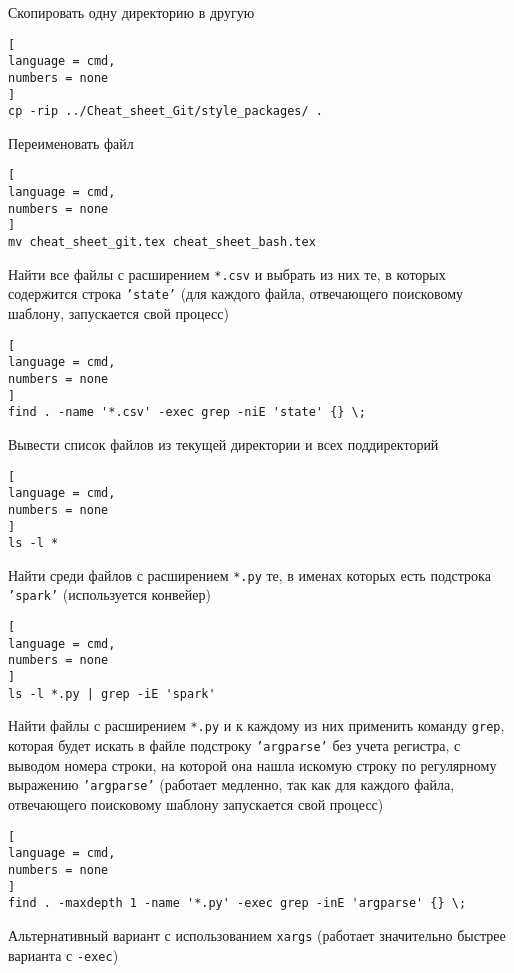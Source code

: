 \documentclass[%
	11pt,
	a4paper,
	utf8,
		]{article}
\begin{document}
Скопировать одну директорию в другую

\begin{lstlisting}[
language = cmd,
numbers = none
]
cp -rip ../Cheat_sheet_Git/style_packages/ .
\end{lstlisting}

Переименовать файл

\begin{lstlisting}[
language = cmd,
numbers = none
]
mv cheat_sheet_git.tex cheat_sheet_bash.tex
\end{lstlisting}

Найти все файлы с расширением \texttt{*.csv} и выбрать из них те, в которых содержится строка \texttt{'state'} (для каждого файла, отвечающего поисковому шаблону, запускается свой процесс)

\begin{lstlisting}[
language = cmd,
numbers = none
]
find . -name '*.csv' -exec grep -niE 'state' {} \;
\end{lstlisting}

Вывести список файлов из текущей директории и всех поддиректорий

\begin{lstlisting}[
language = cmd,
numbers = none
]
ls -l *
\end{lstlisting}

Найти среди файлов с расширением \texttt{*.py} те, в именах которых есть подстрока \texttt{'spark'} (используется конвейер)

\begin{lstlisting}[
language = cmd,
numbers = none
]
ls -l *.py | grep -iE 'spark'
\end{lstlisting}

Найти файлы с расширением \texttt{*.py} и к каждому из них применить команду \texttt{grep}, которая будет искать в файле подстроку \texttt{'argparse'} без учета регистра, с выводом номера строки, на которой она нашла искомую строку по регулярному выражению \texttt{'argparse'} (работает {\color{deepred} медленно}, так как для каждого файла, отвечающего поисковому шаблону запускается свой процесс)

\begin{lstlisting}[
language = cmd,
numbers = none
]
find . -maxdepth 1 -name '*.py' -exec grep -inE 'argparse' {} \;
\end{lstlisting}

Альтернативный вариант с использованием \texttt{xargs} (работает значительно быстрее варианта с \texttt{-exec})
\end{document}

